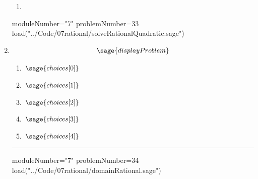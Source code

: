 \documentclass[14pt]{extbook}
\newcommand{\litem}[1]{\item#1\hspace*{-1cm}\rule{\textwidth}{0.4pt}}
\begin{document}
\begin{enumerate}
{\begin{enumerate}[label=\Alph*.]
        \item {}
\end{enumerate}
}
\begin{sagesilent}
moduleNumber="7"
problemNumber=33
load("../Code/07rational/solveRationalQuadratic.sage")
\end{sagesilent}

\litem{ 

   \[ \sage{displayProblem} \]

  	\begin{enumerate}[label=\Alph*.]
    \item \( \sage{choices[0]} \)
    \item \( \sage{choices[1]} \)
    \item \( \sage{choices[2]} \)
    \item \( \sage{choices[3]} \)
    \item \( \sage{choices[4]} \)
  	\end{enumerate}
  }
\begin{sagesilent}
moduleNumber="7"
problemNumber=34
load("../Code/07rational/domainRational.sage")
\end{sagesilent}


\end{enumerate}
\end{document}
